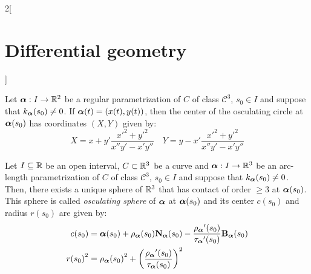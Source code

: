 \documentclass[../../../main_math.tex]{subfiles}
\begin{document}
\begin{multicols}{2}[\section{Differential geometry}]
\begin{proposition}
  \end{proposition}
  \begin{proposition}
    Let $\boldsymbol{\mathrm{\alpha}}:I\rightarrow\mathbb{R}^2$ be a regular parametrization of $C$ of class $\mathcal{C}^3$, $s_0\in I$ and suppose that $k_{\boldsymbol{\mathrm{\alpha}}}(s_0)\ne 0$. If $\boldsymbol{\mathrm{\alpha}}(t)=(x(t),y(t))$, then the center of the osculating circle at $\boldsymbol{\mathrm{\alpha}}(s_0)$ has coordinates $(X,Y)$ given by:
    $$X=x+y'\frac{{x'}^2+{y'}^2}{x''y'-x'y''}\quad Y=y-x'\frac{{x'}^2+{y'}^2}{x''y'-x'y''}$$
  \end{proposition}
  \begin{center}
    \begin{minipage}{\linewidth}
      \centering
      
    \end{minipage}
  \end{center}
  \begin{definition}
    Let $I\subseteq\mathbb{R}$ be an open interval, $C\subset\mathbb{R}^3$ be a curve and $\boldsymbol{\mathrm{\alpha}}:I\rightarrow\mathbb{R}^3$ be an arc-length parametrization of $C$ of class $\mathcal{C}^3$, $s_0\in I$ and suppose that $k_{\boldsymbol{\mathrm{\alpha}}}(s_0)\ne 0$. Then, there exists a unique sphere of $\mathbb{R}^3$ that has contact of order $\geq 3$ at $\boldsymbol{\mathrm{\alpha}}(s_0)$. This sphere is called \emph{osculating sphere} of $\boldsymbol{\mathrm{\alpha}}$ at $\boldsymbol{\mathrm{\alpha}}(s_0)$ and its center $c(s_0)$ and radius $r(s_0)$ are given by:
    \begin{align*}
      c(s_0)     & =\boldsymbol{\mathrm{\alpha}}(s_0)+{\rho_{\boldsymbol{\mathrm{\alpha}}}}(s_0){\boldsymbol{\mathrm{N}}_{\boldsymbol{\mathrm{\alpha}}}}(s_0)-\frac{{\rho_{\boldsymbol{\mathrm{\alpha}}}}'(s_0)}{{\tau_{\boldsymbol{\mathrm{\alpha}}}}'(s_0)}{\boldsymbol{\mathrm{B}}_{\boldsymbol{\mathrm{\alpha}}}}(s_0) \\
      {r(s_0)}^2 & ={{\rho_{\boldsymbol{\mathrm{\alpha}}}}(s_0)}^2+{\left(\frac{{\rho_{\boldsymbol{\mathrm{\alpha}}}}'(s_0)}{{\tau_{\boldsymbol{\mathrm{\alpha}}}}(s_0)}\right)}^2
    \end{align*}
  \end{definition}

\end{multicols}
\end{document}
